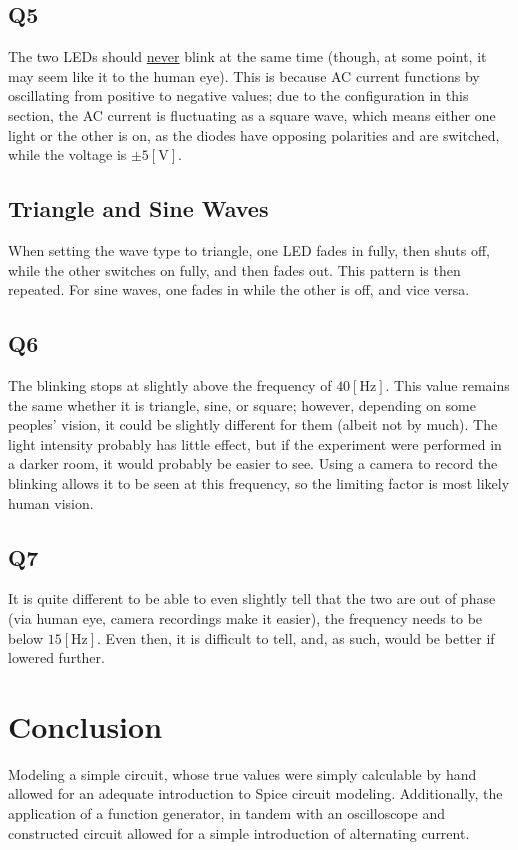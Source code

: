 \documentclass[
	letterpaper, %
	10pt, %
]{CSUniSchoolLabReport}
\begin{document}
\subsection{Q5} The two LEDs should \underline{never} blink at the same time (though, at some point, it may seem like it to the human eye). This is because AC current functions by oscillating from positive to negative values; due to the configuration in this section, the AC current is fluctuating as a square wave, which means either one light or the other is on, as the diodes have opposing polarities and are switched, while the voltage is $\pm5[\si{\volt}]$.

\subsection{Triangle and Sine Waves} When setting the wave type to triangle, one LED fades in fully, then shuts off, while the other switches on fully, and then fades out. This pattern is then repeated. For sine waves, one fades in while the other is off, and vice versa.

\subsection{Q6} The blinking stops at slightly above the frequency of $40[\si{\hertz}]$. This value remains the same whether it is triangle, sine, or square; however, depending on some peoples' vision, it could be slightly different for them (albeit not by much). The light intensity probably has little effect, but if the experiment were performed in a darker room, it would probably be easier to see. Using a camera to record the blinking allows it to be seen at this frequency, so the limiting factor is most likely human vision.

\subsection{Q7} It is quite different to be able to even slightly tell that the two are out of phase (via human eye, camera recordings make it easier), the frequency needs to be below $15[\si{\hertz}]$. Even then, it is difficult to tell, and, as such, would be better if lowered further.

\section{Conclusion}

Modeling a simple circuit, whose true values were simply calculable by hand allowed for an adequate introduction to Spice circuit modeling. Additionally, the application of a function generator, in tandem with an oscilloscope and constructed circuit allowed for a simple introduction of alternating current.
\end{document}
